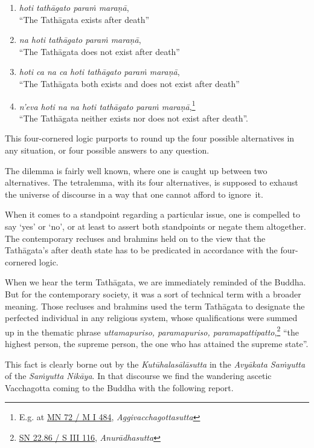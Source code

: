 \begin{enumerate}
\def\labelenumi{\arabic{enumi}.}
\tightlist
\item
  \emph{hoti tathāgato paraṁ maraṇā},\\
  ``The Tathāgata exists after death''
\item
  \emph{na hoti tathāgato paraṁ maraṇā},\\
  ``The Tathāgata does not exist after death''
\item
  \emph{hoti ca na ca hoti tathāgato paraṁ maraṇā},\\
  ``The Tathāgata both exists and does not exist after death''
\item
  \emph{n'eva hoti na na hoti tathāgato paraṁ maraṇā},\footnote{E.g. at \href{https://suttacentral.net/mn72/pli/ms}{MN 72 / M I 484}, \emph{Aggivacchagottasutta}}\\
  ``The Tathāgata neither exists nor does not exist after death''.
\end{enumerate}

This four-cornered logic purports to round up the four possible alternatives in any situation, or four possible answers to any question.

The dilemma is fairly well known, where one is caught up between two alternatives. The tetralemma, with its four alternatives, is supposed to exhaust the universe of discourse in a way that one cannot afford to ignore~it.

When it comes to a standpoint regarding a particular issue, one is compelled to say `yes' or `no', or at least to assert both standpoints or negate them altogether. The contemporary recluses and brahmins held on to the view that the Tathāgata's after death state has to be predicated in accordance with the four-cornered logic.

When we hear the term Tathāgata, we are immediately reminded of the Buddha. But for the contemporary society, it was a sort of technical term with a broader meaning. Those recluses and brahmins used the term Tathāgata to designate the perfected individual in any religious system, whose qualifications were summed up in the thematic phrase \emph{uttamapuriso, paramapuriso, paramapattipatto},\footnote{\href{https://suttacentral.net/sn22.86/pli/ms}{SN 22.86 / S III 116}, \emph{Anurādhasutta}} ``the highest person, the supreme person, the one who has attained the supreme state''.

This fact is clearly borne out by the \emph{Kutūhalasālāsutta} in the \emph{Avyākata Saṁyutta} of the \emph{Saṁyutta Nikāya}. In that discourse we find the wandering ascetic Vacchagotta coming to the Buddha with the following report.

